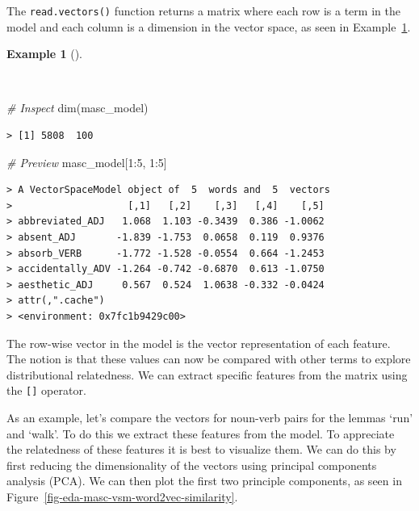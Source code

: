\documentclass[
  letterpaper,
]{latex/krantz}
\newenvironment{Shaded}{\begin{snugshade}}{\end{snugshade}}
\newcommand{\CommentTok}[1]{\textcolor[rgb]{0.00,0.00,0.00}{\textit{#1}}}
\newcommand{\DecValTok}[1]{\textcolor[rgb]{0.00,0.00,0.00}{#1}}
\newcommand{\FunctionTok}[1]{\textcolor[rgb]{0.00,0.00,0.00}{#1}}
\newcommand{\NormalTok}[1]{\textcolor[rgb]{0.00,0.00,0.00}{#1}}
\newcommand{\SpecialCharTok}[1]{\textcolor[rgb]{0.00,0.00,0.00}{#1}}
\theoremstyle{definition}
\newtheorem{example}{Example}[chapter]
\theoremstyle{remark}
\begin{document}
The \texttt{read.vectors()} function returns a matrix where each row is
a term in the model and each column is a dimension in the vector space,
as seen in Example~\ref{exm-eda-masc-vsm-word2vec-vector-object}.

\begin{example}[]\protect\hypertarget{exm-eda-masc-vsm-word2vec-vector-object}{}\label{exm-eda-masc-vsm-word2vec-vector-object}

~

\begin{Shaded}
\begin{Highlighting}[]
\CommentTok{\# Inspect}
\FunctionTok{dim}\NormalTok{(masc\_model)}
\end{Highlighting}
\end{Shaded}

\begin{verbatim}
> [1] 5808  100
\end{verbatim}

\begin{Shaded}
\begin{Highlighting}[]
\CommentTok{\# Preview}
\NormalTok{masc\_model[}\DecValTok{1}\SpecialCharTok{:}\DecValTok{5}\NormalTok{, }\DecValTok{1}\SpecialCharTok{:}\DecValTok{5}\NormalTok{]}
\end{Highlighting}
\end{Shaded}

\begin{verbatim}
> A VectorSpaceModel object of  5  words and  5  vectors
>                    [,1]   [,2]    [,3]   [,4]    [,5]
> abbreviated_ADJ   1.068  1.103 -0.3439  0.386 -1.0062
> absent_ADJ       -1.839 -1.753  0.0658  0.119  0.9376
> absorb_VERB      -1.772 -1.528 -0.0554  0.664 -1.2453
> accidentally_ADV -1.264 -0.742 -0.6870  0.613 -1.0750
> aesthetic_ADJ     0.567  0.524  1.0638 -0.332 -0.0424
> attr(,".cache")
> <environment: 0x7fc1b9429c00>
\end{verbatim}

\end{example}

The row-wise vector in the model is the vector representation of each
feature. The notion is that these values can now be compared with other
terms to explore distributional relatedness. We can extract specific
features from the matrix using the \texttt{{[}{]}} operator.

As an example, let's compare the vectors for noun-verb pairs for the
lemmas `run' and `walk'. To do this we extract these features from the
model. To appreciate the relatedness of these features it is best to
visualize them. We can do this by first reducing the dimensionality of
the vectors using principal components analysis (PCA). We can then plot
the first two principle components, as seen in
Figure~\ref{fig-eda-masc-vsm-word2vec-similarity}.
\end{document}
